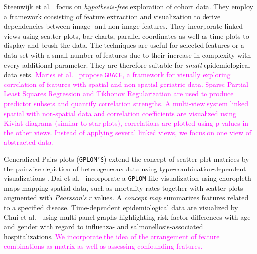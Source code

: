 \documentclass[journal]{style/vgtc} 			          %
\newcommand{\magenta}[1]{\textcolor{magenta}{#1}}
\begin{document}
Steenwijk et al.~\cite{Steenwijk} focus on \emph{hypothesis-free} exploration of cohort data.
They employ a framework consisting of feature extraction and visualization to derive dependencies between image- and non-image features.
They incorporate linked views using scatter plots, bar charts, parallel coordinates as well as time plots to display and brush the data.
The techniques are useful for selected features or a data set with a small number of features due to their increase in complexity with every additional parameter.
They are therefore suitable for \emph{small} epidemiological data sets.
\magenta{
Maries et al.~\cite{GRACE} propose \texttt{GRACE}, a framework for visually exploring correlation of features with spatial and non-spatial geriatric data.
Sparse Partial Least Squares Regression and Tikhonov Regularization are used to produce predictor subsets and quantify correlation strengths.
A multi-view system linked spatial with non-spatial data and correlation coefficients are visualized using Kiviat diagrams (similar to star plots), correlations are plotted using p-values in the other views.
Instead of applying several linked views, we focus on one view of abstracted data.
}

Generalized Pairs plots (\texttt{GPLOM'S}) extend the concept of scatter plot matrices by the pairwise depiction of heterogeneous data using type-combination-dependent visualizations \cite{GPLOMS, Francois2013}.
Dai et al.~\cite{Dai2005} incorporate a \texttt{GPLOM}-like visualization using choropleth maps mapping spatial data, such as mortality rates together with scatter plots augmented with \emph{Pearsson's} $r$ values.
A \emph{concept map} summarizes features related to a specified disease.
Time-dependent epidemiological data are visualized by Chui et al.~\cite{Chui2011} using multi-panel graphs highlighting risk factor differences with age and gender with regard to influenza- and salmonellosis-associated hospitalizations.
\magenta{
We incorporate the idea of the arrangement of feature combinations as matrix as well as assessing confounding features.
}
\end{document}
